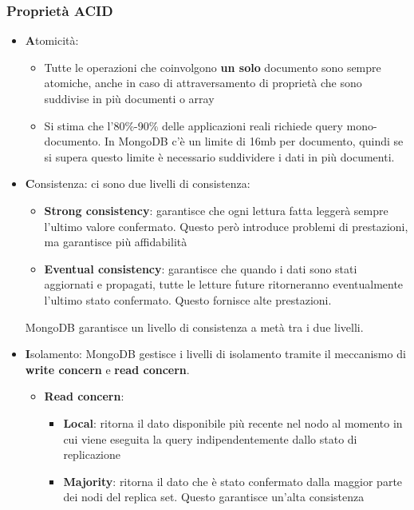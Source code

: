 \documentclass[a4paper,twoside]{article}
\begin{document}
\subsubsection{Proprietà ACID}
\begin{itemize}
  \item \textbf{A}tomicità: 
    \begin{itemize}
      \item Tutte le operazioni che coinvolgono \textbf{un solo} documento
        sono sempre atomiche, anche in caso di attraversamento di proprietà che sono
        suddivise in più documenti o array

      \item Si stima che l'80\%-90\% delle applicazioni reali richiede query mono-documento.
        In MongoDB c'è un limite di 16mb per documento, quindi se si supera questo limite
        è necessario suddividere i dati in più documenti.
    \end{itemize}

  \item \textbf{C}onsistenza: ci sono due livelli di consistenza:
    \begin{itemize}
      \item \textbf{Strong consistency}: garantisce che ogni lettura fatta leggerà
        sempre l'ultimo valore confermato. Questo però introduce problemi di
        prestazioni, ma garantisce più affidabilità

      \item \textbf{Eventual consistency}: garantisce che quando i dati sono stati
        aggiornati e propagati, tutte le letture future ritorneranno eventualmente
        l'ultimo stato confermato. Questo fornisce alte prestazioni.
    \end{itemize}
    MongoDB garantisce un livello di consistenza a metà tra i due livelli.

  \item \textbf{I}solamento: MongoDB gestisce i livelli di isolamento tramite il
    meccanismo di \textbf{write concern} e \textbf{read concern}.
    \begin{itemize}
      \item \textbf{Read concern}:
        \begin{itemize}
          \item \textbf{Local}: ritorna il dato disponibile più recente nel nodo al momento in
            cui viene eseguita la query indipendentemente dallo stato di replicazione

          \item \textbf{Majority}: ritorna il dato che è stato confermato dalla maggior parte
            dei nodi del replica set. Questo garantisce un'alta consistenza


\end{itemize}
\end{itemize}
\end{itemize}
\end{document}
